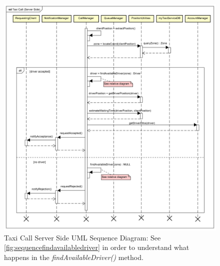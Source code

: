 \documentclass[a4paper]{article}
\begin{document}
\begin{figure}[H]
\includegraphics[width=\sequenceWidth]{Sequence-TaxiCallServerSide}
\centering
\caption[Taxi Call Server Side UML Sequence Diagram]{Taxi Call Server Side UML Sequence Diagram: \newline \centering See \autoref{fig:sequencefindavailabledriver} in order to understand what happens in the \emph{findAvailableDriver()} method.}
\label{fig:sequencecallserverside}
\end{figure}
\end{document}
